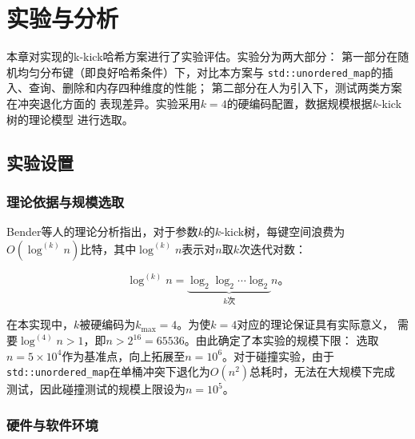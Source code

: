 \documentclass[
    type = bachelor,
    fontset = win,
    decl-page = true,
  ]{njuthesis}
\begin{document}
\chapter{实验与分析}

本章对实现的k-kick哈希方案进行了实验评估。实验分为两大部分：\newline
第一部分在随机均匀分布键（即良好哈希条件）下，对比本方案与\newline
\texttt{std::unordered\_map}的插入、查询、删除和内存四种维度的性能；
第二部分在人为引入下，测试两类方案在冲突退化方面的
表现差异。实验采用$k=4$的硬编码配置，数据规模根据$k$-kick树的理论模型
进行选取。

\section{实验设置}

\subsection{理论依据与规模选取}

Bender等人的理论分析\cite{1}指出，对于参数$k$的$k$-kick树，每键空间浪费为
$O(\log^{(k)} n)$比特，其中$\log^{(k)} n$表示对$n$取$k$次迭代对数：

\begin{equation}
\log^{(k)} n = \underbrace{\log_2 \log_2 \cdots \log_2}_{k\text{次}} n \text{。}
\end{equation}

在本实现中，$k$被硬编码为$k_{\max}=4$。为使$k=4$对应的理论保证具有实际意义，
需要$\log^{(4)} n > 1$，即$n > 2^{16} = 65536$。由此确定了本实验的规模下限：
选取$n=5\times 10^4$作为基准点，向上拓展至$n=10^6$。对于碰撞实验，由于
\texttt{std::unordered\_map}在单桶冲突下退化为$O(n^2)$总耗时，无法在大规模下完成
测试，因此碰撞测试的规模上限设为$n=10^5$。

\subsection{硬件与软件环境}
\end{document}

